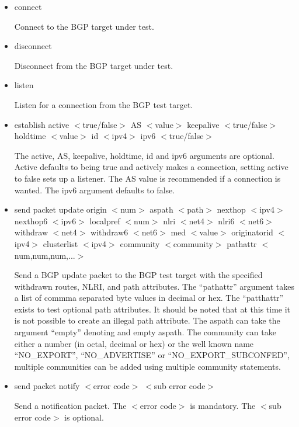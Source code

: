 \documentclass[11pt]{article}
\begin{document}
\begin{itemize}

  \item connect

  Connect to the BGP target under test.

  \item disconnect

  Disconnect from the BGP target under test.

  \item listen 

  Listen for a connection from the BGP test target.

  \item {\sf establish
  active $<$true/false$>$
  AS $<$value$>$
  keepalive $<$true/false$>$
  holdtime $<$value$>$ 
  id $<$ipv4$>$}
  ipv6 $<$true/false$>$

  The active, AS, keepalive, holdtime, id and ipv6 arguments are
  optional. Active defaults to being true and actively makes a
  connection, setting active to false sets up a listener. The AS value
  is recommended if a connection is wanted. The ipv6 argument defaults
  to false.

  \item {\sf send packet update 
  origin $<$num$>$ 
  aspath $<$path$>$ 
  nexthop $<$ipv4$>$ 
  nexthop6 $<$ipv6$>$ 
  localpref $<$num$>$
  nlri $<$net4$>$
  nlri6 $<$net6$>$
  withdraw $<$net4$>$
  withdraw6 $<$net6$>$
  med $<$value$>$
  originatorid $<$ipv4$>$ 
  clusterlist $<$ipv4$>$ 
  community $<$community$>$
  pathattr $<$num,num,num,...$>$}

  Send a BGP update packet to the BGP test target with the specified
  withdrawn routes, NLRI, and path attributes. The ``pathattr''
  argument takes a list of commma separated byte values in decimal or
  hex. The ``patthattr'' exists to test optional path attributes. It
  should be noted that at this time it is not possible to create an
  illegal path attribute. The aspath can take the argument ``empty''
  denoting and empty aspath. The community can take either a number
  (in octal, decimal or hex)
  or the well known name ``NO\_EXPORT'', ``NO\_ADVERTISE'' or
  ``NO\_EXPORT\_SUBCONFED'', multiple communities can be added using
  multiple community statements. 

  \item {\sf send packet notify $<$error code$>$ $<$sub error code$>$}

  Send a notification packet. The $<$error code$>$ is mandatory. The
  $<$sub error code$>$ is optional.


\end{itemize}
\end{document}
